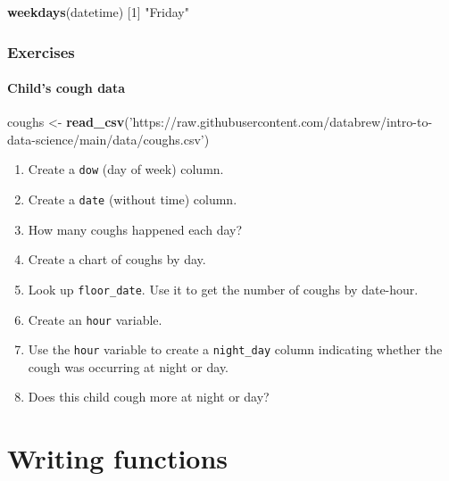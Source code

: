 \documentclass[
]{book}
\newenvironment{Shaded}{\begin{snugshade}}{\end{snugshade}}
\newcommand{\DecValTok}[1]{\textcolor[rgb]{0.00,0.00,0.81}{#1}}
\newcommand{\KeywordTok}[1]{\textcolor[rgb]{0.13,0.29,0.53}{\textbf{#1}}}
\newcommand{\NormalTok}[1]{#1}
\newcommand{\StringTok}[1]{\textcolor[rgb]{0.31,0.60,0.02}{#1}}
\begin{document}
\begin{Shaded}
\begin{Highlighting}[]
\KeywordTok{weekdays}\NormalTok{(datetime)}
\NormalTok{[}\DecValTok{1}\NormalTok{] }\StringTok{"Friday"}
\end{Highlighting}
\end{Shaded}

\hypertarget{exercises-14}{%
\subsection{Exercises}\label{exercises-14}}

\hypertarget{childs-cough-data}{%
\subsubsection*{Child's cough data}\label{childs-cough-data}}

\begin{Shaded}
\begin{Highlighting}[]
\NormalTok{coughs <-}\StringTok{ }\KeywordTok{read_csv}\NormalTok{(}\StringTok{'https://raw.githubusercontent.com/databrew/intro-to-data-science/main/data/coughs.csv'}\NormalTok{)}
\end{Highlighting}
\end{Shaded}

\begin{enumerate}
\def\labelenumi{\arabic{enumi}.}
\item
  Create a \texttt{dow} (day of week) column.
\item
  Create a \texttt{date} (without time) column.
\item
  How many coughs happened each day?
\item
  Create a chart of coughs by day.
\item
  Look up \texttt{floor\_date}. Use it to get the number of coughs by date-hour.
\item
  Create an \texttt{hour} variable.
\item
  Use the \texttt{hour} variable to create a \texttt{night\_day} column indicating whether the cough was occurring at night or day.
\item
  Does this child cough more at night or day?
\end{enumerate}

\hypertarget{writing-functions}{%
\chapter{Writing functions}\label{writing-functions}}
\end{document}
